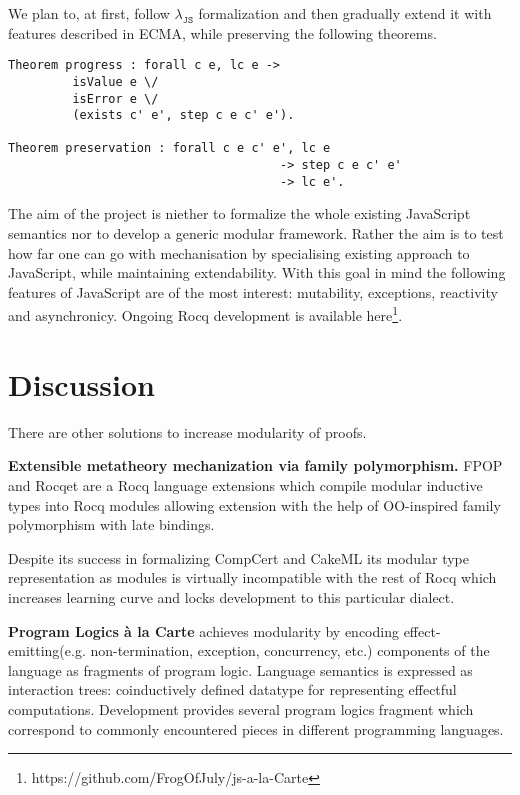 \documentclass[sigplan,nonacm]{acmart}
\begin{document}
We plan to, at first, follow $\lambda_{\texttt{JS}}$\cite{guha2010essence} formalization and then gradually extend it with features described in ECMA, while preserving the following theorems.

\begin{lstlisting}[numbers=none, language=Coq]
Theorem progress : forall c e, lc e -> 
         isValue e \/ 
         isError e \/ 
         (exists c' e', step c e c' e').

Theorem preservation : forall c e c' e', lc e
                                      -> step c e c' e'
                                      -> lc e'.
\end{lstlisting}

The aim of the project is niether to formalize the whole existing JavaScript semantics nor to develop a generic modular framework. 
Rather the aim is to test how far one can go with mechanisation by specialising existing approach to JavaScript, while maintaining extendability. 
With this goal in mind the following features of JavaScript are of the most interest: mutability, exceptions, reactivity and asynchronicy. 
Ongoing Rocq development is available here\footnote{https://github.com/FrogOfJuly/js-a-la-Carte}.


\section{Discussion}

There are other solutions to increase modularity of proofs. 

\medskip

\textbf{Extensible metatheory mechanization via family polymorphism. } FPOP\cite{jin2023extensible} and Rocqet\cite{ebresafe2025certified} are a Rocq language extensions which compile modular inductive types into Rocq modules allowing extension with the help of 
OO-inspired family polymorphism with late bindings. 

Despite its success in formalizing CompCert and CakeML its modular type representation as modules is virtually incompatible with the rest of Rocq which increases learning curve and locks development to this particular dialect. 

\medskip
\textbf{Program Logics à la Carte}\cite{vistrup2025program} achieves modularity by encoding effect-emitting(e.g. non-termination, exception, concurrency, etc.) components of the language as fragments of program logic. 
Language semantics is expressed as interaction trees\cite{xia2019interaction}: coinductively defined datatype for representing effectful computations. 
Development provides several program logics fragment which correspond to commonly encountered pieces in different programming languages. 
\end{document}
